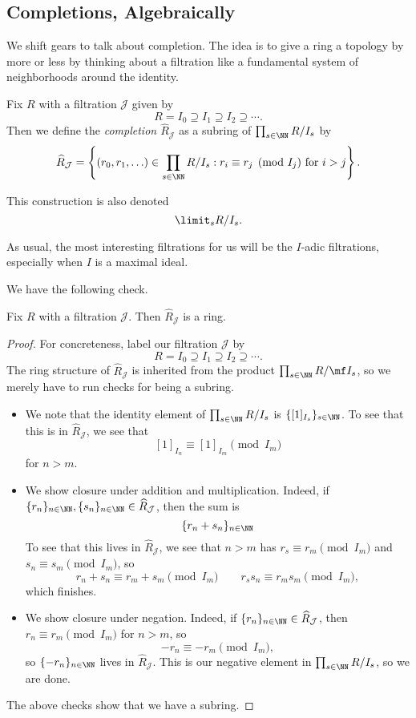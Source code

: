 \subsection{Completions, Algebraically}
We shift gears to talk about completion. The idea is to give a ring a topology by more or less by thinking about a filtration like a fundamental system of neighborhoods around the identity.
\begin{definition}
	Fix $R$ with a filtration $\mathcal J$ given by
	\[R=I_0\supseteq I_1\supseteq I_2\supseteq\cdots.\]
	Then we define the \textit{completion $\widehat R_\mathcal J$} as a subring of $\prod_{s\in\NN}R/I_s$ by
	\[\widehat R_\mathcal J=\left\{(r_0,r_1,\ldots)\in\prod_{s\in\NN}R/I_s:r_i\equiv r_j\pmod{I_j}\text{ for }i>j\right\}.\]
\end{definition}
\begin{remark}[Nir]
	This construction is also denoted
	\[\limit_sR/I_s.\]
\end{remark}
As usual, the most interesting filtrations for us will be the $I$-adic filtrations, especially when $I$ is a maximal ideal.

We have the following check.
\begin{lemma}
	Fix $R$ with a filtration $\mathcal J$. Then $\widehat R_\mathcal J$ is a ring.
\end{lemma}
\begin{proof}
	For concreteness, label our filtration $\mathcal J$ by
	\[R=I_0\supseteq I_1\supseteq I_2\supseteq\cdots.\]
	The ring structure of $\widehat R_\mathcal J$ is inherited from the product $\prod_{s\in\NN}R/\mf I_s$, so we merely have to run checks for being a subring.
	\begin{itemize}
		\item We note that the identity element of $\prod_{s\in\NN}R/I_s$ is $\{[1]_{I_s}\}_{s\in\NN}$. To see that this is in $\widehat R_\mathcal J$, we see that
		\[[1]_{I_n}\equiv[1]_{I_m}\pmod{I_m}\]
		for $n>m$.
		\item We show closure under addition and multiplication. Indeed, if $\{r_n\}_{n\in\NN},\{s_n\}_{n\in\NN}\in\widehat R_\mathcal J$, then the sum is
		\[\{r_n+s_n\}_{n\in\NN}\]
		To see that this lives in $\widehat R_\mathcal J$, we see that $n>m$ has $r_s\equiv r_m\pmod{I_m}$ and $s_n\equiv s_m\pmod{I_m}$, so
		\[r_n+s_n\equiv r_m+s_m\pmod{I_m}\qquad r_ss_n\equiv r_ms_m\pmod{I_m},\]
		which finishes.
		\item We show closure under negation. Indeed, if $\{r_n\}_{n\in\NN}\in\widehat R_\mathcal J$, then $r_n\equiv r_m\pmod{I_m}$ for $n>m$, so
		\[-r_n\equiv-r_m\pmod{I_m},\]
		so $\{-r_n\}_{n\in\NN}$ lives in $\widehat R_\mathcal J$. This is our negative element in $\prod_{s\in\NN}R/I_s$, so we are done.
	\end{itemize}
	The above checks show that we have a subring.
\end{proof}

